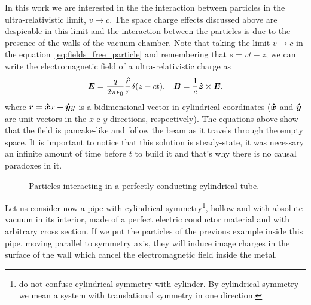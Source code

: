 \begin{apendicesenv}
    In this work we are interested in the the interaction between particles in the ultra-relativistic limit, $v \to c$. The space charge effects discussed above are despicable in this limit and the interaction between the particles is due to the presence of the walls of the vacuum chamber. Note that taking the limit $v \to c$ in the equation~\eqref{eq:fields_free_particle} and remembering that $s = vt - z$, we can write the electromagnetic field of a ultra-relativistic charge as
    \begin{align}
    	\boldsymbol{E} =
		\frac{q}{2\pi\epsilon_0}\frac{\boldsymbol{\hat{r}}}{r}\delta(z-ct), &
		& \boldsymbol{B} =\frac{1}{c}\boldsymbol{\hat{z}}\times\boldsymbol{E},
    \end{align}
    where $\boldsymbol{r} = \boldsymbol{\hat{x}}x + \boldsymbol{\hat{y}}y$ is a bidimensional vector in cylindrical coordinates ($\boldsymbol{\hat{x}}$ and $\boldsymbol{\hat{y}}$ are unit vectors in the $x$ e $y$ directions, respectively). The equations above show that the field is pancake-like and follow the beam as it travels through the empty space. It is important to notice that this solution is steady-state, it was necessary an infinite amount of time before $t$ to build it and that's why there is no causal paradoxes in it.

    \begin{figure}
	    \centering
	    \caption{Particles interacting in a perfectly conducting cylindrical tube.}
        \label{fig:wake2}
    \end{figure}

    Let us consider now a pipe with cylindrical symmetry\footnote{do not confuse cylindrical symmetry with cylinder. By cylindrical symmetry we mean a system with translational symmetry in one direction.}, hollow and with absolute vacuum in its interior, made of a perfect electric conductor material and with arbitrary cross section. If we put the particles of the previous example inside this pipe, moving parallel to symmetry axis, they will induce image charges in the surface of the wall which cancel the electromagnetic field inside the metal.


\end{apendicesenv}
